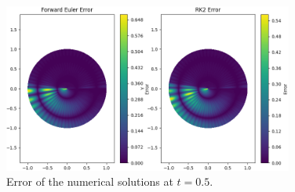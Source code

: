 \documentclass{homework}
\begin{document}
\begin{figure}[H]
    \centering
    \includegraphics[width = 0.85\textwidth]{media/time_step_error.png}
    \caption{Error of the numerical solutions at $t=0.5$.}
\label{time_step_error}\end{figure}
\end{document}
